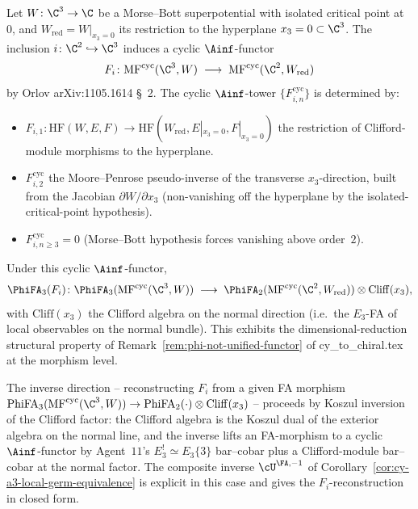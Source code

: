 \begin{example}[Hyperplane restriction $\mathrm{MF}(\C^3, W) \to \mathrm{MF}(\C^2, W|_{x_3=0})$]
\label{ex:hyperplane-restriction-morphism}
Let $W \colon \C^3 \to \C$ be a Morse--Bott superpotential with
isolated critical point at $0$, and $W_{\mathrm{red}} = W|_{x_3 = 0}$
its restriction to the hyperplane $x_3 = 0 \subset \C^3$.  The
inclusion $i \colon \C^2 \hookrightarrow \C^3$ induces a cyclic
$\Ainf$-functor
\[
  F_i \colon
  \mathrm{MF}^{\mathrm{cyc}}(\C^3, W)
  \;\longrightarrow\;
  \mathrm{MF}^{\mathrm{cyc}}(\C^2, W_{\mathrm{red}})
\]
by Orlov arXiv:1105.1614 \S~2.  The cyclic $\Ainf$-tower
$\{F_{i,n}^{\mathrm{cyc}}\}$ is determined by:
\begin{itemize}
 \item $F_{i,1} \colon \mathrm{HF}(W, E, F) \to
       \mathrm{HF}(W_{\mathrm{red}}, E|_{x_3=0}, F|_{x_3=0})$
       the restriction of Clifford-module morphisms to the hyperplane.
 \item $F_{i,2}^{\mathrm{cyc}}$ the Moore--Penrose pseudo-inverse of
       the transverse $x_3$-direction, built from the Jacobian
       $\partial W/\partial x_3$ (non-vanishing off the hyperplane
       by the isolated-critical-point hypothesis).
 \item $F_{i,n \geq 3}^{\mathrm{cyc}} = 0$ (Morse--Bott hypothesis
       forces vanishing above order~$2$).
\end{itemize}
Under this cyclic $\Ainf$-functor,
\[
  \PhiFA_3(F_i)
  \colon
  \PhiFA_3(\mathrm{MF}^{\mathrm{cyc}}(\C^3, W))
  \;\longrightarrow\;
  \PhiFA_2(\mathrm{MF}^{\mathrm{cyc}}(\C^2, W_{\mathrm{red}})) \otimes
  \mathrm{Cliff}(x_3),
\]
with $\mathrm{Cliff}(x_3)$ the Clifford algebra on the normal direction
(i.e.\ the $E_3$-FA of local observables on the normal bundle).  This
exhibits the dimensional-reduction structural property of
Remark~\ref{rem:phi-not-unified-functor} of
cy\_to\_chiral.tex at the morphism level.
\end{example}

\begin{remark}
\label{rem:bar-cobar-inverse-hyperplane}
The inverse direction -- reconstructing $F_i$ from a given FA morphism
$\mathrm{PhiFA}_3(\mathrm{MF}^{\mathrm{cyc}}(\C^3,W)) \to
\mathrm{PhiFA}_2(\cdot) \otimes \mathrm{Cliff}(x_3)$ -- proceeds by
Koszul inversion of the Clifford factor: the Clifford algebra is the
Koszul dual of the exterior algebra on the normal line, and the inverse
lifts an FA-morphism to a cyclic $\Ainf$-functor by Agent~$11$'s
$E_3^! \simeq E_3\{3\}$ bar--cobar plus a Clifford-module bar--cobar
at the normal factor.  The composite inverse
$\cU^{\FA, -1}$ of Corollary~\ref{cor:cy-a3-local-germ-equivalence} is
explicit in this case and gives the $F_i$-reconstruction in closed
form.
\end{remark}

